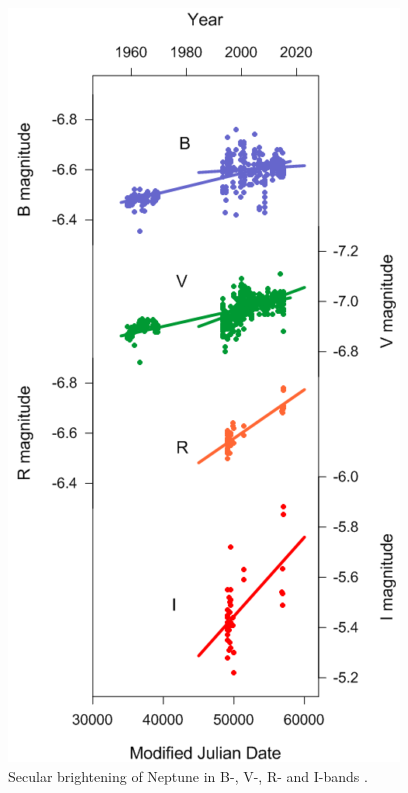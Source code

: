 \documentclass[12pt,a4paper]{report}
\begin{document}
\begin{figure}[hbtp]
\centering
\includegraphics[scale=1]{Neptune_secular.png}
\caption{Secular brightening of Neptune in B-, V-, R- and I-bands \citep{Schmude2016}. \label{Fig:netuno-secular}}
\end{figure}
\end{document}
